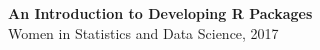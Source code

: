 \documentclass[12pt]{report}
\begin{document}
\\\ 

\begin{center}
\textbf{An Introduction to Developing R Packages} \\


Women in Statistics and Data Science, 2017
\end{center}
\end{document}
